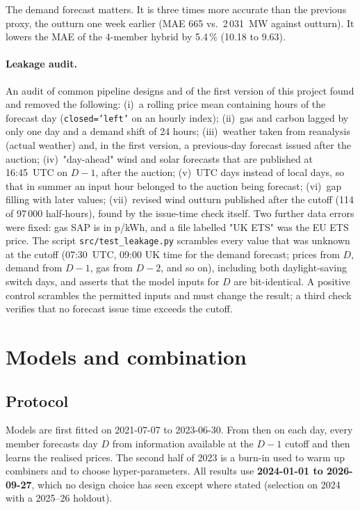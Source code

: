 \documentclass[11pt,a4paper]{article}
\begin{document}
The demand forecast matters. It is three times more accurate than the previous proxy, the outturn one week earlier (MAE 665 vs.\ 2\,031~MW against outturn). It lowers the MAE of the 4-member hybrid by 5.4\,\% (10.18 to 9.63).

\paragraph{Leakage audit.} An audit of common pipeline designs and of the first version of this project found and removed the following:
(i)~a rolling price mean containing hours of the forecast day (\texttt{closed='left'} on an hourly index);
(ii)~gas and carbon lagged by only one day and a demand shift of 24 hours;
(iii)~weather taken from reanalysis (actual weather) and, in the first version, a previous-day forecast issued after the auction;
(iv)~"day-ahead" wind and solar forecasts that are published at 16:45~UTC on $D\!-\!1$, after the auction;
(v)~UTC days instead of local days, so that in summer an input hour belonged to the auction being forecast;
(vi)~gap filling with later values;
(vii)~revised wind outturn published after the cutoff (114 of 97\,000 half-hours), found by the issue-time check itself.
Two further data errors were fixed: gas SAP is in p/kWh, and a file labelled "UK ETS" was the EU ETS price. The script \texttt{src/test\_leakage.py} scrambles every value that was unknown at the cutoff (07:30~UTC, 09:00 UK time for the demand forecast; prices from $D$, demand from $D\!-\!1$, gas from $D\!-\!2$, and so on), including both daylight-saving switch days, and asserts that the model inputs for $D$ are bit-identical. A positive control scrambles the permitted inputs and must change the result; a third check verifies that no forecast issue time exceeds the cutoff. 

\section{Models and combination}
\label{sec:point}

\subsection{Protocol}
Models are first fitted on 2021-07-07 to 2023-06-30. From then on each day, every member forecasts day $D$ from information available at the $D\!-\!1$ cutoff and then learns the realised prices. The second half of 2023 is a burn-in used to warm up combiners and to choose hyper-parameters. All results use \textbf{2024-01-01 to 2026-09-27}, which no design choice has seen except where stated (selection on 2024 with a 2025--26 holdout).
\end{document}
